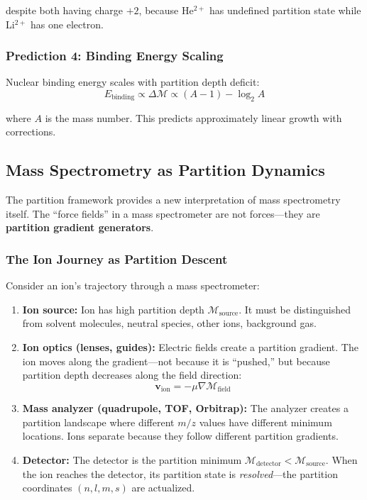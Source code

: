 \documentclass[twocolumn,10pt,a4paper]{article}
\theoremstyle{definition}
\theoremstyle{remark}
\newcommand{\Depth}{\mathcal{M}}
\begin{document}
despite both having charge $+2$, because He$^{2+}$ has undefined partition state while Li$^{2+}$ has one electron.

\subsubsection{Prediction 4: Binding Energy Scaling}

Nuclear binding energy scales with partition depth deficit:
\begin{equation}
    E_{\text{binding}} \propto \Delta\Depth \propto (A-1) - \log_2 A
\end{equation}

where $A$ is the mass number. This predicts approximately linear growth with corrections.

\subsection{Mass Spectrometry as Partition Dynamics}

The partition framework provides a new interpretation of mass spectrometry itself. The ``force fields'' in a mass spectrometer are not forces---they are \textbf{partition gradient generators}.

\subsubsection{The Ion Journey as Partition Descent}

Consider an ion's trajectory through a mass spectrometer:

\begin{enumerate}
    \item \textbf{Ion source:} Ion has high partition depth $\Depth_{\text{source}}$. It must be distinguished from solvent molecules, neutral species, other ions, background gas.

    \item \textbf{Ion optics (lenses, guides):} Electric fields create a partition gradient. The ion moves along the gradient---not because it is ``pushed,'' but because partition depth decreases along the field direction:
    \begin{equation}
        \mathbf{v}_{\text{ion}} = -\mu \nabla \Depth_{\text{field}}
    \end{equation}

    \item \textbf{Mass analyzer (quadrupole, TOF, Orbitrap):} The analyzer creates a partition landscape where different $m/z$ values have different minimum locations. Ions separate because they follow different partition gradients.

    \item \textbf{Detector:} The detector is the partition minimum $\Depth_{\text{detector}} < \Depth_{\text{source}}$. When the ion reaches the detector, its partition state is \emph{resolved}---the partition coordinates $(n, l, m, s)$ are actualized.
\end{enumerate}
\end{document}
